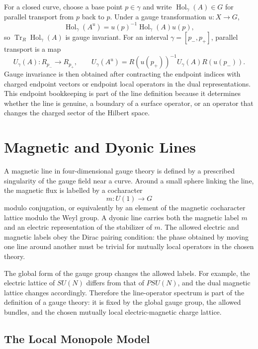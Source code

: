 For a closed curve, choose a base point \(p\in\gamma\) and write
\(\operatorname{Hol}_\gamma(A)\in G\) for parallel transport from \(p\) back
to \(p\).  Under a gauge transformation \(u:X\to G\),
\[
  \operatorname{Hol}_\gamma(A^u)
  =
  u(p)^{-1}\operatorname{Hol}_\gamma(A)u(p),
\]
so \(\operatorname{Tr}_R\operatorname{Hol}_\gamma(A)\) is gauge invariant.
For an interval \(\gamma=[p_-,p_+]\), parallel transport is a map
\[
  U_\gamma(A):R_{p_-}\longrightarrow R_{p_+},
  \qquad
  U_\gamma(A^u)=R(u(p_+))^{-1}U_\gamma(A)R(u(p_-)).
\]
Gauge invariance is then obtained after contracting the endpoint indices with
charged endpoint vectors or endpoint local operators in the dual
representations.  This endpoint bookkeeping is part of the line definition
because it determines whether the line is genuine, a boundary of a surface
operator, or an operator that changes the charged sector of the Hilbert
space.

\section{Magnetic and Dyonic Lines}

A magnetic line in four-dimensional gauge theory is defined by a prescribed
singularity of the gauge field near a curve.  Around a small sphere linking
the line, the magnetic flux is labelled by a cocharacter
\[
  m:U(1)\longrightarrow G
\]
modulo conjugation, or equivalently by an element of the magnetic cocharacter
lattice modulo the Weyl group.  A dyonic line carries both the magnetic label
\(m\) and an electric representation of the stabilizer of \(m\).  The allowed
electric and magnetic labels obey the Dirac pairing condition: the phase
obtained by moving one line around another must be trivial for mutually local
operators in the chosen theory.

The global form of the gauge group changes the allowed labels.  For example,
the electric lattice of \(SU(N)\) differs from that of \(PSU(N)\), and the
dual magnetic lattice changes accordingly.  Therefore the line-operator
spectrum is part of the definition of a gauge theory: it is fixed by the
global gauge group, the allowed bundles, and the chosen mutually local
electric-magnetic charge lattice.

\subsection{The Local Monopole Model}

